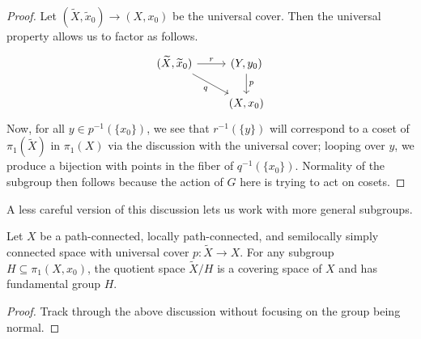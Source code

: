 \documentclass[../notes.tex]{subfiles}
\begin{document}
\begin{proof}
	Let $(\widetilde X,\widetilde x_0)\to(X,x_0)$ be the universal cover. Then the universal property allows us to factor as follows.
	\[\begin{tikzcd}
		{(\widetilde X,\widetilde x_0)} & {(Y,y_0)} \\
		& {(X,x_0)}
		\arrow["p", from=1-2, to=2-2]
		\arrow["r", from=1-1, to=1-2]
		\arrow["q"', from=1-1, to=2-2]
	\end{tikzcd}\]
	Now, for all $y\in p^{-1}(\{x_0\})$, we see that $r^{-1}(\{y\})$ will correspond to a coset of $\pi_1(\widetilde X)$ in $\pi_1(X)$ via the discussion with the universal cover; looping over $y$, we produce a bijection with points in the fiber of $q^{-1}(\{x_0\})$. Normality of the subgroup then follows because the action of $G$ here is trying to act on cosets.
\end{proof}
A less careful version of this discussion lets us work with more general subgroups.
\begin{proposition}
	Let $X$ be a path-connected, locally path-connected, and semilocally simply connected space with universal cover $p\colon\widetilde X\to X$. For any subgroup $H\subseteq\pi_1(X,x_0)$, the quotient space $\widetilde X/H$ is a covering space of $X$ and has fundamental group $H$.
\end{proposition}
\begin{proof}
	Track through the above discussion without focusing on the group being normal.
\end{proof}
\end{document}
